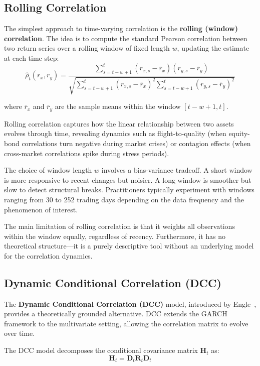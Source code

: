 \subsection{Rolling Correlation}\label{sec:rolling-correlation}

The simplest approach to time-varying correlation is the \textbf{rolling (window) correlation}. The idea is to compute the standard Pearson correlation between two return series over a rolling window of fixed length $w$, updating the estimate at each time step:
$$\hat{\rho}_t(r_x, r_y) = \frac{\sum_{s=t-w+1}^{t}(r_{x,s} - \bar{r}_x)(r_{y,s} - \bar{r}_y)}{\sqrt{\sum_{s=t-w+1}^{t}(r_{x,s} - \bar{r}_x)^2 \sum_{s=t-w+1}^{t}(r_{y,s} - \bar{r}_y)^2}}$$

where $\bar{r}_x$ and $\bar{r}_y$ are the sample means within the window $[t-w+1, t]$.

Rolling correlation captures how the linear relationship between two assets evolves through time, revealing dynamics such as flight-to-quality (when equity-bond correlations turn negative during market crises) or contagion effects (when cross-market correlations spike during stress periods).

\begin{remark}
The choice of window length $w$ involves a bias-variance tradeoff. A short window is more responsive to recent changes but noisier. A long window is smoother but slow to detect structural breaks. Practitioners typically experiment with windows ranging from 30 to 252 trading days depending on the data frequency and the phenomenon of interest.
\end{remark}

The main limitation of rolling correlation is that it weights all observations within the window equally, regardless of recency. Furthermore, it has no theoretical structure---it is a purely descriptive tool without an underlying model for the correlation dynamics.
\subsection{Dynamic Conditional Correlation (DCC)}

The \textbf{Dynamic Conditional Correlation (DCC)} model, introduced by Engle~\cite{Engle2002}, provides a theoretically grounded alternative. DCC extends the GARCH framework to the multivariate setting, allowing the correlation matrix to evolve over time.

The DCC model decomposes the conditional covariance matrix $\mathbf{H}_t$ as:
$$\mathbf{H}_t = \mathbf{D}_t \mathbf{R}_t \mathbf{D}_t$$

